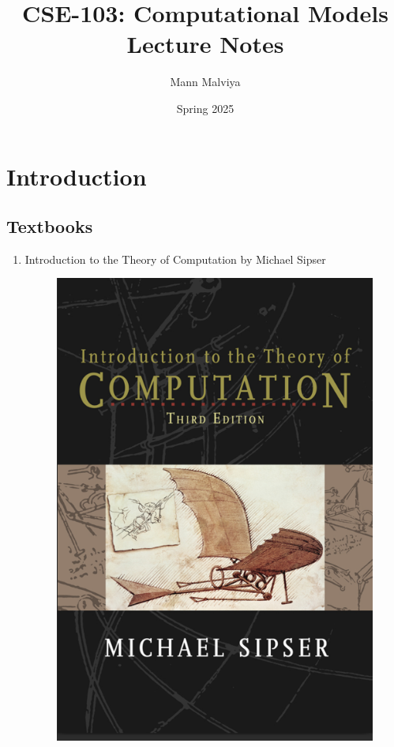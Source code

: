 \documentclass{article}
\title{CSE-103: Computational Models\\ Lecture Notes}
\author{Mann Malviya}
\date{Spring 2025}
\begin{document}
\maketitle
\maketitle
\tableofcontents
\newpage

\section*{Introduction}


\subsection*{Textbooks}

\begin{enumerate}
    \item Introduction to the Theory of Computation by Michael Sipser
    \begin{figure}[H]
        \centering
        \includegraphics[scale=2]{103_TB.png}
        \caption*{}
    \end{figure}
\end{enumerate}
\end{document}
